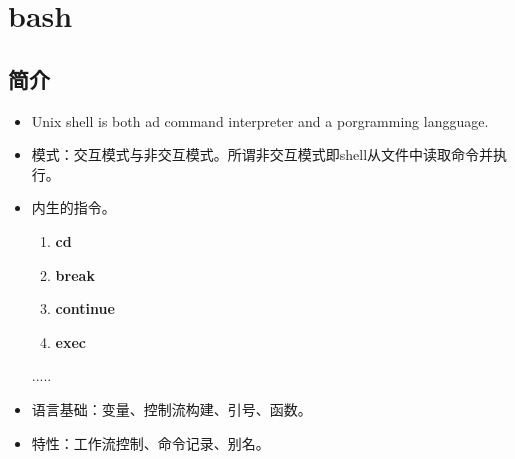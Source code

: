 \section{bash}
  \subsection{简介}
  \begin{itemize}
  	\item Unix shell is both ad command interpreter and a porgramming langguage.
  	\item 模式：交互模式与非交互模式。所谓非交互模式即shell从文件中读取命令并执行。
  	\item 内生的指令。
  		\begin{enumerate}
  			\item \textbf{cd} 
  			\item \textbf{break}
  			\item \textbf{continue}
  			\item \textbf{exec}
  		\end{enumerate}
  			.....
  	\item 语言基础：变量、控制流构建、引号、函数。
  	\item 特性：工作流控制、命令记录、别名。
  \end{itemize}
